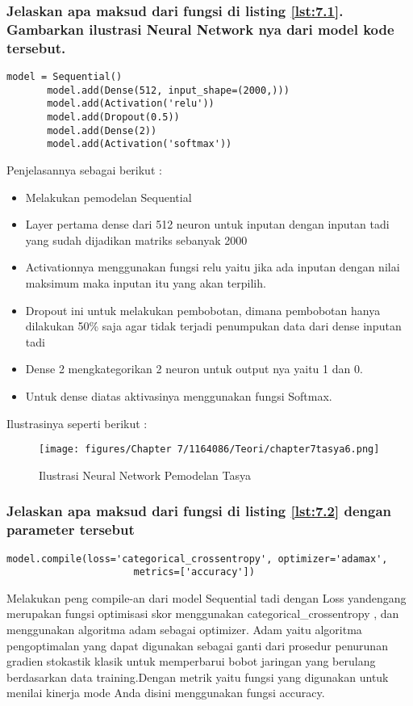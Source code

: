 \subsubsection{Jelaskan apa maksud dari fungsi di listing \ref{lst:7.1}. Gambarkan ilustrasi Neural Network nya dari model kode tersebut.}
\begin{lstlisting}[caption=Membuat model Neural Network,label={lst:7.1}]
       model = Sequential()
       model.add(Dense(512, input_shape=(2000,)))
       model.add(Activation('relu'))
       model.add(Dropout(0.5))
       model.add(Dense(2))
       model.add(Activation('softmax'))
\end{lstlisting}
Penjelasannya sebagai berikut :
\begin{itemize}
\item Melakukan pemodelan Sequential
\item Layer pertama dense dari 512 neuron untuk inputan dengan inputan tadi yang sudah dijadikan matriks sebanyak 2000
\item Activationnya menggunakan fungsi relu yaitu jika ada inputan dengan nilai maksimum maka inputan itu yang akan terpilih.
\item Dropout ini untuk melakukan pembobotan, dimana pembobotan hanya dilakukan 50\% saja agar tidak terjadi penumpukan data dari dense inputan tadi
\item Dense 2 mengkategorikan 2 neuron untuk output nya yaitu 1 dan 0.
\item Untuk dense diatas aktivasinya menggunakan fungsi Softmax.
\end{itemize}

Ilustrasinya seperti berikut :
\begin{figure}[ht]
\centering
\texttt{[image: figures/Chapter 7/1164086/Teori/chapter7tasya6.png]}
\caption{Ilustrasi Neural Network Pemodelan Tasya}
\label{Teori}
\end{figure}

\subsubsection{Jelaskan apa maksud dari fungsi di listing \ref{lst:7.2} dengan parameter tersebut}
\begin{lstlisting}[caption=Compile model,label={lst:7.2}]
	model.compile(loss='categorical_crossentropy', optimizer='adamax',
	                  metrics=['accuracy'])
\end{lstlisting}
Melakukan peng compile-an dari model Sequential tadi dengan Loss yandengang merupakan fungsi optimisasi skor  menggunakan categorical\_crossentropy , dan menggunakan algoritma adam sebagai optimizer. Adam yaitu algoritma pengoptimalan yang dapat digunakan sebagai ganti dari prosedur penurunan gradien stokastik klasik untuk memperbarui bobot jaringan yang berulang berdasarkan data training.Dengan metrik yaitu fungsi yang digunakan untuk menilai kinerja mode Anda disini menggunakan fungsi accuracy.

